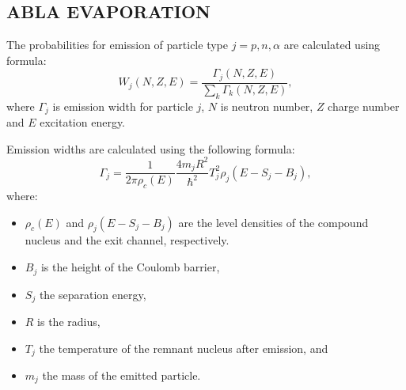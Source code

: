 \documentclass[20pt]{article}
\newenvironment{textbox}
{\begin{lrbox}{\dummybox}\begin{minipage}{0.9\columnwidth}}
{\end{minipage}\end{lrbox}\raisebox{-\depth}{\psshadowbox[framesep=1em,framearc=.1,shadow=true]{\usebox{\dummybox}}}\vspace{0.005\textheight}}
\begin{document}
\begin{center}
\begin{multicols}{3}
\begin{textbox}


\section*{{\Huge {\sf ABLA EVAPORATION}}}
The probabilities for emission of particle type $j = {p, n, \alpha}$
are calculated using formula:
\begin{equation}
W_j(N,Z,E) = \frac{\Gamma_j(N,Z,E)}{\sum_k\Gamma_k(N,Z,E)},
\label{eqn:probabilities}
\end{equation}
where $\Gamma_j$ is emission width for particle $j$, $N$ is neutron
number, $Z$ charge number and $E$ excitation energy.
\vskip0.5cm

Emission widths are calculated using the following formula:
\begin{equation}
\Gamma_j = \frac{1}{2 \pi \rho_c(E)} \frac{4 m_j R^2}{\hbar^2} T_j^2 \rho_j(E - S_j - B_j),
\label{eqn:emissionwidth}
\end{equation}
where:
\begin{itemize}
\item $\rho_c(E)$ and $\rho_j(E - S_j - B_j)$ are the level densities
of the compound nucleus and the exit channel, respectively.
\item $B_j$ is the height of the Coulomb barrier,
\item $S_j$ the separation energy,
\item $R$ is the radius,
\item $T_j$ the temperature of the remnant nucleus after
emission, and
\item $m_j$ the mass of the emitted particle.
\end{itemize}
\end{textbox}

\section*{{\Huge {\sf }}}


\end{multicols}
\end{center}
\end{document}
